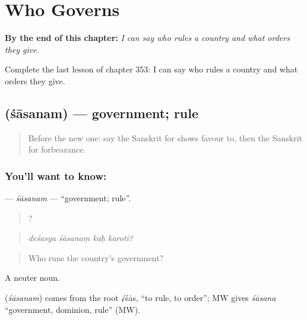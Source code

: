
\chapter{Who Governs}
\label{ch:sa-who-governs}

\begin{chapteropening}
\textbf{By the end of this chapter:} \emph{I can say who rules a country and what orders they give.}

Complete the last lesson of chapter 353: I can say who rules a country and what orders they give.
\end{chapteropening}

\section[\texorpdfstring{\sk{शासनम्} (śāsanam)}{शासनम् (śāsanam)}]{ (śāsanam) — government; rule}

\label{lesson:SA-C353-sasanam}



\begin{quote}
Before the new one: say the Sanskrit for shows favour to, then the Sanskrit for forbearance.
\end{quote}

\subsection*{You'll want to know: }
\textbf{} — \emph{śāsanam} — \textquotedblleft{}government; rule\textquotedblright{}.

\begin{quote}
   ?
\end{quote}

\begin{quote}
\emph{deśasya śāsanaṃ kaḥ karoti?}
\end{quote}

\begin{quote}
Who runs the country's government?
\end{quote}

A neuter noun.

\begin{cousinweb}
\textbf{} (\emph{śāsanam}) comes from the root √śās, \textquotedblleft{}to rule, to order\textquotedblright{}; MW gives \emph{śāsana} \textquotedblleft{}government, dominion, rule\textquotedblright{} (MW).
\end{cousinweb}

